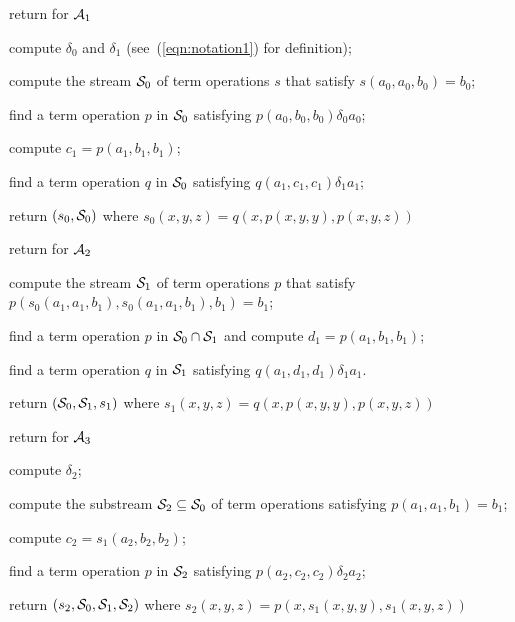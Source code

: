   \LinesNumbered
  \begin{algorithm}%
  
    \caption{return \ldto for $\mathcal{A}_1$
    \label{alg:stream-ldt1}  }
  
  compute $\delta_0$ and $\delta_1$ (see~(\ref{eqn:notation1}) for definition);
  
  compute the stream $\mathcal{S}_0$ of term operations $s$ that satisfy $s(a_0,a_0,b_0) = b_0$;
  
  find a term operation $p$ in $\mathcal{S}_0$ satisfying $p(a_0, b_0, b_0) \mathrel{\delta_0} a_0$;
  
  compute $c_1 = p(a_1,b_1,b_1)$;
  
  find a term operation $q$ in $\mathcal{S}_0$ satisfying $q(a_1, c_1, c_1) \mathrel{\delta_1} a_1$;
  
  return $(s_0, \mathcal{S}_0)$ where $s_0(x,y,z) = q(x,p(x,y,y),p(x,y,z))$
  \end{algorithm}
  
  
  \LinesNumbered
  \begin{algorithm}
  
    \caption{return \ldto for $\mathcal{A}_2$
    \label{alg:stream-ldt2}  }
  
  compute the stream $\mathcal{S}_1$ of term operations $p$
  that satisfy $p(s_0(a_1,a_1,b_1), s_0(a_1,a_1,b_1), b_1) = b_1$;
  
  find a term operation $p$ in $\mathcal{S}_0 \cap \mathcal{S}_1$ and compute $d_1 = p(a_1,b_1,b_1)$;
  
  find a term operation $q$ in $\mathcal{S}_1$ satisfying $q(a_1, d_1, d_1) \mathrel{\delta_1} a_1$.
  
  return $(\mathcal{S}_0, \mathcal{S}_1, s_1)$ where $s_1(x,y,z) = q(x, p(x,y,y), p(x,y,z))$
  \end{algorithm}
  
  
  \LinesNumbered
  \begin{algorithm}
  
    \caption{return \ldto for $\mathcal{A}_3$
    \label{alg:stream-ldt3}  }
  
  compute $\delta_2$;
  
  compute the substream $\mathcal{S}_2 \subseteq \mathcal{S}_0$ of term operations satisfying
   $p(a_1,a_1,b_1) = b_1$;
  
  compute $c_2 = s_1(a_2, b_2, b_2)$;
  
  find a term operation $p$ in $\mathcal{S}_2$ satisfying
  $p(a_2, c_2, c_2) \mathrel{\delta_2} a_2$;
  
  return $(s_2, \mathcal{S}_0, \mathcal{S}_1, \mathcal{S}_2)$ where $s_2(x,y,z) = p(x, s_1(x,y,y), s_1(x,y,z))$
  \end{algorithm}
  
